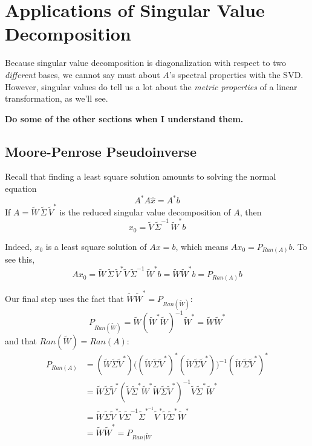 \section{Applications of Singular Value Decomposition}

Because singular value decomposition is diagonalization with respect to two \textit{different} bases, we cannot say must about $A$'s spectral properties with the SVD. However, singular values do tell us a lot about the \textit{metric properties} of a linear transformation, as we'll see. 

\textbf{Do some of the other sections when I understand them.}

\subsection{Moore-Penrose Pseudoinverse}

Recall that finding a least square solution amounts to solving the normal equation 
$$A^{*} A \hat{x} = A^{*} b$$
If $A = \widetilde{W} \, \widetilde{\Sigma} \, \widetilde{V}^{*}$ is the reduced singular value decomposition of $A$, then 
$$ x_{0} = \widetilde{V} \, \widetilde{\Sigma}^{-1} \, \widetilde{W}^{*} b$$

Indeed, $x_{0}$ is a least square solution of $Ax = b$, which means $Ax_{0} = P_{Ran(A)} b$. To see this, 
$$Ax_{0} = \widetilde{W} \, \widetilde{\Sigma} \, \widetilde{V}^{*} \widetilde{V} \, \widetilde{\Sigma}^{-1} \, \widetilde{W}^{*} b = \widetilde{W} \widetilde{W}^{*} b = P_{Ran(A)} b $$

Our final step uses the fact that $\widetilde{W} \widetilde{W}^{*} = P_{Ran(\widetilde{W})}$: 
$$P_{Ran(\widetilde{W})} = \widetilde{W} (\widetilde{W}^{*} \widetilde{W})^{-1} \widetilde{W}^{*} = \widetilde{W} \widetilde{W}^{*}$$
and that $Ran(\widetilde{W}) = Ran(A)$:
$$
\begin{aligned}
P_{Ran(A)} &= (\widetilde{W} \widetilde{\Sigma} \widetilde{V}^{*}) \big( (\widetilde{W} \widetilde{\Sigma} \widetilde{V}^{*})^{*} (\widetilde{W} \widetilde{\Sigma} \widetilde{V}^{*}) \big)^{-1} (\widetilde{W} \widetilde{\Sigma} \widetilde{V}^{*})^{*} \\
&= \widetilde{W} \widetilde{\Sigma} \widetilde{V}^{*} ( \widetilde{V} \widetilde{\Sigma}^{*} \widetilde{W}^{*} \widetilde{W} \widetilde{\Sigma} \widetilde{V}^{*} )^{-1} \widetilde{V} \widetilde{\Sigma}^{*} \widetilde{W}^{*} \\
&= \widetilde{W} \widetilde{\Sigma} \widetilde{V}^{*} \widetilde{V} \widetilde{\Sigma}^{-1} \widetilde{\Sigma}^{*^{-1}} \widetilde{V}^{*}  \widetilde{V} \widetilde{\Sigma}^{*} \widetilde{W}^{*} \\
&= \widetilde{W} \widetilde{W}^{*} = P_{Ran(\widetilde{W}}
\end{aligned}
$$


